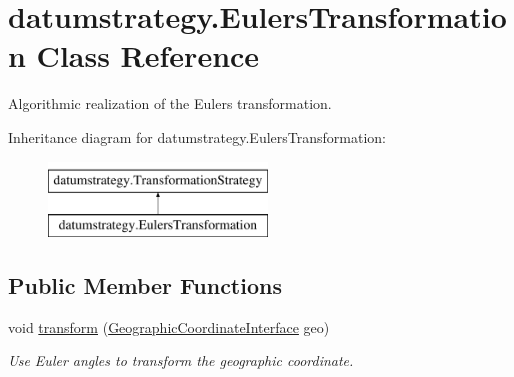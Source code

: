 \hypertarget{classdatumstrategy_1_1_eulers_transformation}{}\section{datumstrategy.\+Eulers\+Transformation Class Reference}
\label{classdatumstrategy_1_1_eulers_transformation}


Algorithmic realization of the Euler\textquotesingle{}s transformation.  


Inheritance diagram for datumstrategy.\+Eulers\+Transformation\+:\begin{figure}[H]
\begin{center}
\leavevmode
\includegraphics[height=2.000000cm]{classdatumstrategy_1_1_eulers_transformation}
\end{center}
\end{figure}
\subsection*{Public Member Functions}
\begin{DoxyCompactItemize}
\item 
void \hyperlink{classdatumstrategy_1_1_eulers_transformation_a37661559087a055288365ddebea5d699}{transform} (\hyperlink{classcoordinates_1_1_geographic_coordinate_interface}{Geographic\+Coordinate\+Interface} geo)
\begin{DoxyCompactList}\small\item\em Use Euler angles to transform the geographic coordinate. \end{DoxyCompactList}\end{DoxyCompactItemize}
